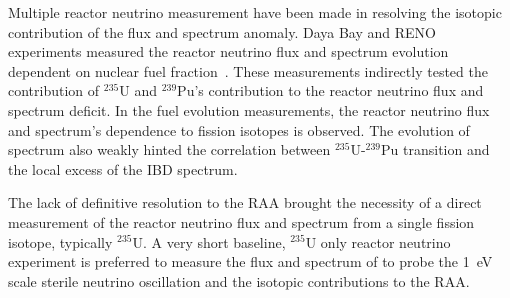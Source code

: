     Multiple reactor neutrino measurement have been made in resolving the isotopic contribution of the flux and spectrum anomaly.
    Daya Bay and RENO experiments measured the reactor neutrino flux and spectrum evolution dependent on nuclear fuel fraction~\cite{bib:DYBEvo, bib:RENOevolution}. 
    These measurements indirectly tested the contribution of $^{235}$U and $^{239}$Pu's contribution to the reactor neutrino flux and spectrum deficit.
    In the fuel evolution measurements, the reactor neutrino flux and spectrum's dependence to fission isotopes is observed.
    The evolution of spectrum also weakly hinted the correlation between $^{235}$U-$^{239}$Pu transition and the local excess of the IBD spectrum.

    The lack of definitive resolution to the RAA brought the necessity of a direct measurement of the reactor neutrino flux and spectrum from a single fission isotope, typically $^{235}$U.
    A very short baseline, $^{235}$U only reactor neutrino experiment is preferred to measure the flux and spectrum of \nuebar to probe the 1~eV scale sterile neutrino oscillation and the isotopic contributions to the RAA.